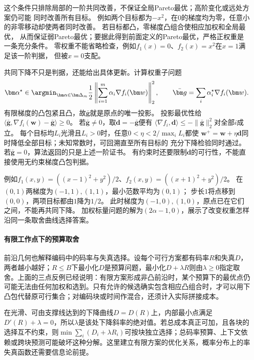这个条件只排除局部的一阶共同改善，不保证全局Pareto最优；高阶变化或远处方案仍可能
同时改善所有目标。
例如两个目标都为$-x^2$，在$0$的梯度均为零，任意小的非零移动却使两者同时改善。
若目标都凸，零梯度凸组合使相应加权和全局最优，
从而保证弱Pareto最优；要据此得到前面定义的Pareto最优，严格正权重是一条充分条件。
零权重不能省略检查，例如$f_1(x)=0$、$f_2(x)=x^2$在$x=1$满足该一阶判据，
但被$x=0$支配。

共同下降不只是判据，还能给出具体更新。计算权重子问题
\[
 \bm\alpha^\star\in\argmin_{\bm\alpha\in\bm\Delta_m}
 \frac12\left\|\sum_{i=1}^m\alpha_i\nabla f_i(\bm w)\right\|_2^2,
 \qquad
 \bar{\bm g}=\sum_i\alpha_i^\star\nabla f_i(\bm w).
\]
有限梯度的凸包紧且凸，故$\bar{\bm g}$就是原点的唯一投影。
投影最优性给
$\langle\bar{\bm g},\nabla f_i(\bm w)-\bar{\bm g}\rangle\geq0$。
若$\bar{\bm g}\neq0$，取$\bm d=-\bar{\bm g}$便有
$\langle\nabla f_i,\bm d\rangle\leq-\|\bar{\bm g}\|_2^2$对全部$i$成立。
每个目标均$L_i$光滑且$L_i>0$时，任意$0<\eta<2/\max_i L_i$都使
$\bm w^+=\bm w+\eta\bm d$同时降低全部目标；未知常数时，可回溯直至所有目标的
充分下降检验同时通过。若$\bar{\bm g}=0$，算法返回的只是上述一阶证书。
有约束时还要限制$\bm d$的可行性，不能直接使用无约束梯度凸包判据。

例如$f_1(x,y)=((x-1)^2+y^2)/2$、$f_2(x,y)=((x+1)^2+y^2)/2$。
在$(0,1)$两梯度为$(-1,1),(1,1)$，最小范数平均为$(0,1)$；
步长$1$将点移到$(0,0)$，两项目标都由$1$降为$1/2$。
此时梯度为$(-1,0),(1,0)$，原点已在它们之间，不能再共同下降。
加权标量问题的解为$(2\alpha-1,0)$，展示了改变权重怎样沿同一条取舍曲线选择答案。

\paragraph{有限工作点下的预算取舍}
\label{sec:opt-rate-distortion-operating-points}

前沿几何也解释编码中的码率与失真选择。设每个可行方案都有码率$R$和失真$D$，两者越小越好；$R\leq B$下最小化$D$是预算问题，最小化$D+\lambda R$则由$\lambda\geq0$指定取舍。上面的三点反例已经说明：有限方案形成非凸前沿时，某个预算下的最优点仍可能无法由任何加权和选到。只有允许的候选确实包含相应凸组合时，才可以用下凸包代替原可行集合；对编码块或时间作混合，还须计入实际拼接成本。

在光滑、可由支撑线达到的下降曲线$D=D(R)$上，内部最小点满足$D'(R)+\lambda=0$，所以$\lambda$是该处下降斜率的绝对值。若总成本真正可加，且各块的选择互不约束，则$\min\sum_i(D_i+\lambda R_i)$可按块独立选择；总码率预算、上下文依赖或跨块预测可能破坏这种分解。这里建立有限方案的优化关系，概率分布上的率失真函数还需要信息论前提。


